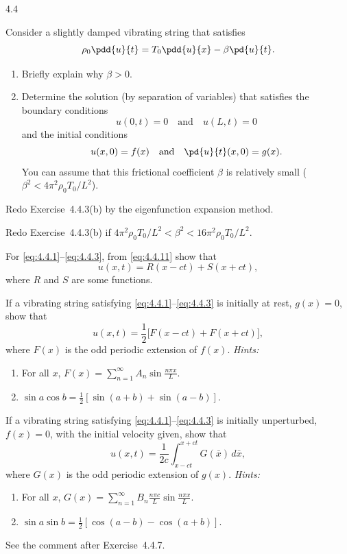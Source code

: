 \begin{exercises}{4.4}
\item Consider a slightly damped vibrating string that satisfies
\[
\rho_0\pdd{u}{t} = T_0\pdd{u}{x} - \beta\pd{u}{t}.
\]

\begin{enumerate}
\item[(a)] Briefly explain why $\beta > 0$.

\item[(b)]\starred Determine the solution (by separation of variables) that satisfies the boundary conditions
\[
u(0,t) = 0 \quad\text{and}\quad u(L,t) = 0
\]
and the initial conditions
\[
u(x,0) = f(x) \quad\text{and}\quad \pd{u}{t}(x,0) = g(x).
\]
You can assume that this frictional coefficient $\beta$ is relatively small ($\beta^2 < 4\pi^2\rho_0 T_0/L^2$).
\end{enumerate}

\item Redo Exercise~4.4.3(b) by the eigenfunction expansion method.

\item Redo Exercise~4.4.3(b) if $4\pi^2\rho_0 T_0/L^2 < \beta^2 < 16\pi^2\rho_0 T_0/L^2$.

\item For \eqref{eq:4.4.1}--\eqref{eq:4.4.3}, from \eqref{eq:4.4.11} show that
\[
u(x,t) = R(x - ct) + S(x + ct),
\]
where $R$ and $S$ are some functions.

\item If a vibrating string satisfying \eqref{eq:4.4.1}--\eqref{eq:4.4.3} is initially at rest, $g(x)=0$, show that
\[
u(x,t) = \frac{1}{2}\bigl[F(x - ct) + F(x + ct)\bigr],
\]
where $F(x)$ is the odd periodic extension of $f(x)$.  \emph{Hints:}
\begin{enumerate}
\item[1.] For all $x$, $F(x) = \sum_{n=1}^{\infty} A_n\sin\frac{n\pi x}{L}$.
\item[2.] $\sin a\cos b = \frac{1}{2}[\sin(a+b) + \sin(a-b)]$.
\end{enumerate}

\item If a vibrating string satisfying \eqref{eq:4.4.1}--\eqref{eq:4.4.3} is initially unperturbed, $f(x) = 0$, with the initial velocity given, show that
\[
u(x,t) = \frac{1}{2c}\int_{x-ct}^{x+ct} G(\bar{x})\,d\bar{x},
\]
where $G(x)$ is the odd periodic extension of $g(x)$.  \emph{Hints:}
\begin{enumerate}
\item[1.] For all $x$, $G(x) = \sum_{n=1}^{\infty} B_n\frac{n\pi c}{L}\sin\frac{n\pi x}{L}$.
\item[2.] $\sin a\sin b = \frac{1}{2}[\cos(a-b) - \cos(a+b)]$.
\end{enumerate}
See the comment after Exercise~4.4.7.


\end{exercises}
